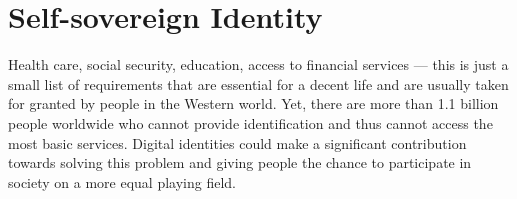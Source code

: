 \chapter{Self-sovereign Identity}\label{chapter: ssi}

Health care, social security, education, access to financial services — this is just a small list of requirements that are essential for a decent life and are usually taken for granted by people in the Western world. Yet, there are more than 1.1 billion people worldwide who cannot provide identification and thus cannot access the most basic services. Digital identities could make a significant contribution towards solving this problem and giving people the chance to participate in society on a more equal playing field. \cite{world_bank_11_2017}

